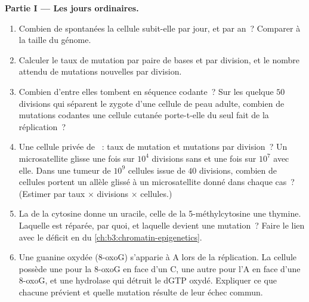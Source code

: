 \begin{problem}
\medskip
\noindent\textbf{Partie I --- Les jours ordinaires.}
\begin{enumerate}
  \item Combien de  spontanées la cellule subit-elle par jour,
        et par an~? Comparer à la taille du génome.
  \item Calculer le taux de mutation par paire de bases et par
        division, et le nombre attendu de mutations nouvelles par
        division.
  \item Combien d'entre elles tombent en séquence codante~? Sur les
        quelque $50$ divisions qui séparent le zygote d'une cellule de
        peau adulte, combien de mutations codantes une cellule cutanée
        porte-t-elle du seul fait de la réplication~?
  \item Une cellule privée de ~: taux de
        mutation et mutations par division~? Un microsatellite glisse
        une fois sur $10^{4}$ divisions sans  et une fois sur $10^{7}$ avec elle. Dans une
        tumeur de $10^{9}$ cellules issue de $40$ divisions, combien de
        cellules portent un allèle glissé à un microsatellite donné
        dans chaque cas~? (Estimer par taux $\times$ divisions $\times$
        cellules.)
  \item La  de la cytosine donne un uracile, celle de la
        5-méthylcytosine une thymine. Laquelle est réparée, par quoi,
        et laquelle devient une mutation~? Faire le lien avec le
        déficit en  du \cref{ch:b3:chromatin-epigenetics}.
  \item Une guanine oxydée (8-oxoG) s'apparie à A lors de la
        réplication. La cellule possède une  pour la 8-oxoG
        en face d'un C, une autre pour l'A en face d'une 8-oxoG, et une
        hydrolase qui détruit le dGTP oxydé. Expliquer ce que chacune
        prévient et quelle mutation résulte de leur échec commun.
\end{enumerate}


\end{problem}
